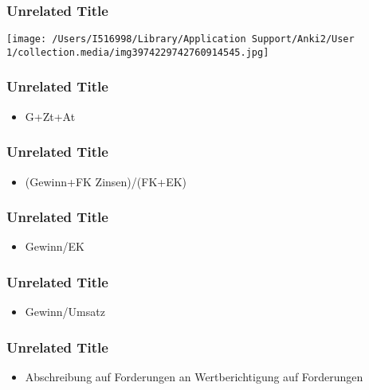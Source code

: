 \documentclass[aspectratio=3218]{beamer}
\begin{document}
\begin{frame}
\frametitle<presentation>{Unrelated Title}

\begin{center}
\texttt{[image: /Users/I516998/Library/Application Support/Anki2/User 1/collection.media/img3974229742760914545.jpg]}
\end{center}


\note[item]{}
\end{frame}
\begin{frame}
\frametitle<presentation>{Unrelated Title}


\begin{itemize}
\item G+Zt+At
\end{itemize}

\note[item]{}
\end{frame}
\begin{frame}
\frametitle<presentation>{Unrelated Title}


\begin{itemize}
\item (Gewinn+FK Zinsen)/(FK+EK)
\end{itemize}

\note[item]{}
\end{frame}
\begin{frame}
\frametitle<presentation>{Unrelated Title}


\begin{itemize}
\item Gewinn/EK
\end{itemize}

\note[item]{}
\end{frame}
\begin{frame}
\frametitle<presentation>{Unrelated Title}


\begin{itemize}
\item Gewinn/Umsatz
\end{itemize}

\note[item]{}
\end{frame}
\begin{frame}
\frametitle<presentation>{Unrelated Title}


\begin{itemize}
\item Abschreibung auf Forderungen an Wertberichtigung auf Forderungen
\end{itemize}

\note[item]{}
\end{frame}
\end{document}
